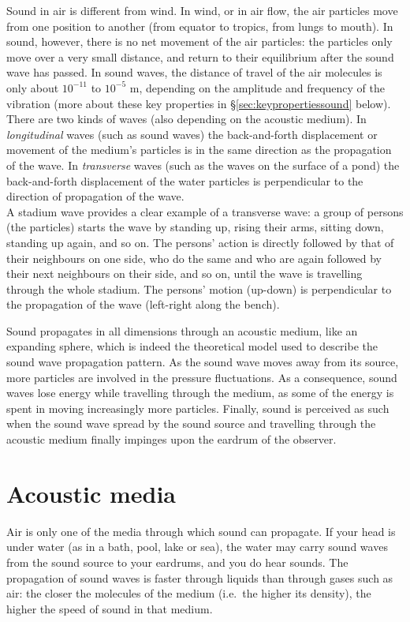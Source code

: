\documentclass[
]{book}
\begin{document}
Sound in air is different from wind. In wind, or in air flow, the air particles move from one position to another (from equator to tropics, from lungs to mouth). In sound, however, there is no net movement of the air particles: the particles only move over a very small distance, and return to their equilibrium after the sound wave has passed. In sound waves, the distance of travel of the air molecules is only about \(10^{-11}\) to \(10^{-5}\) m, depending on the amplitude and frequency of the vibration (more about these key properties in §\ref{sec:keypropertiessound} below).
There are two kinds of waves (also depending on the acoustic medium). In \emph{longitudinal} waves (such as sound waves) the back-and-forth displacement or movement of the medium's particles is in the same direction as the propagation of the wave. In \emph{transverse} waves (such as the waves on the surface of a pond) the back-and-forth displacement of the water particles is perpendicular to the direction of propagation of the wave.\\
A stadium wave provides a clear example of a transverse wave: a group of persons (the particles) starts the wave by standing up, rising their arms, sitting down, standing up again, and so on. The persons' action is directly followed by that of their neighbours on one side, who do the same and who are again followed by their next neighbours on their side, and so on, until the wave is travelling through the whole stadium. The persons' motion (up-down) is perpendicular to the propagation of the wave (left-right along the bench).

Sound propagates in all dimensions through an acoustic medium, like an expanding sphere, which is indeed the theoretical model used to describe the sound wave propagation pattern. As the sound wave moves away from its source, more particles are involved in the pressure fluctuations. As a consequence, sound waves lose energy while travelling through the medium, as some of the energy is spent in moving increasingly more particles. Finally, sound is perceived as such when the sound wave spread by the sound source and travelling through the acoustic medium finally impinges upon the eardrum of the observer.

\section{Acoustic media}\label{acoustic-media}

Air is only one of the media through which sound can propagate. If your head is under water (as in a bath, pool, lake or sea), the water may carry sound waves from the sound source to your eardrums, and you do hear sounds. The propagation of sound waves is faster through liquids than through gases such as air: the closer the molecules of the medium (i.e.~the higher its density), the higher the speed of sound in that medium.
\end{document}
